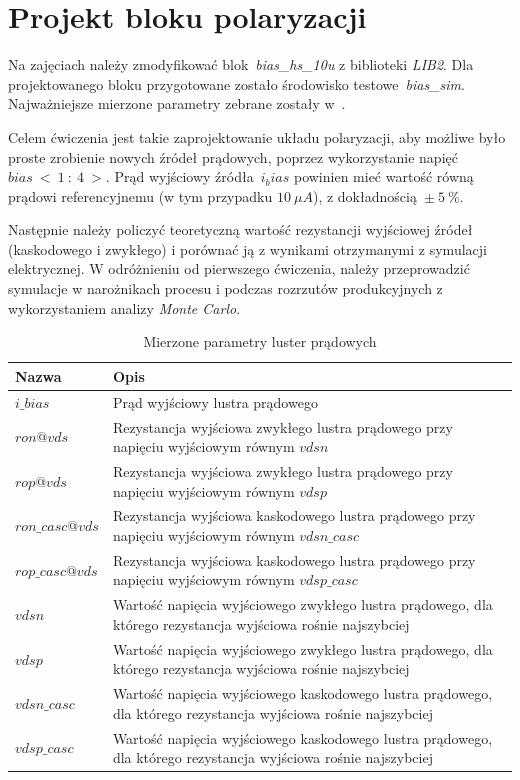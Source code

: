 \documentclass[twoside,pl,final]{labman}
\begin{document}
\chapter{Projekt bloku polaryzacji}
\label{work}

Na zajęciach należy zmodyfikować blok~\emph{bias\_hs\_10u}
z biblioteki \emph{LIB2}.
Dla projektowanego bloku przygotowane zostało
środowisko testowe~\emph{bias\_sim}.
Najważniejsze mierzone parametry zebrane
zostały w~.

Celem ćwiczenia jest takie zaprojektowanie układu polaryzacji,
aby możliwe było proste zrobienie nowych źródeł prądowych,
poprzez wykorzystanie napięć~$bias~<~1~:~4~>$.
Prąd wyjściowy źródła~$i_bias$ powinien mieć wartość
równą prądowi referencyjnemu (w tym przypadku $10~\mu{}A$),
z dokładnością~$\pm~5~\%$.

Następnie należy policzyć teoretyczną wartość rezystancji wyjściowej
źródeł (kaskodowego i zwykłego) i porównać ją
z wynikami otrzymanymi z symulacji elektrycznej.
W odróżnieniu od pierwszego ćwiczenia,
należy przeprowadzić symulacje w narożnikach procesu
 i podczas rozrzutów produkcyjnych z
wykorzystaniem analizy \emph{Monte Carlo}.

\begin{table}[htbp]
  \centering
  \caption{Mierzone parametry luster prądowych}
  \label{tab:work:measure}
  \begin{tabular}{l p{}}
    \hline \hline
    Nazwa & Opis \\
    \hline
    $i\_bias$ & Prąd wyjściowy lustra prądowego \\
    $ron@vds$ & Rezystancja wyjściowa zwykłego lustra prądowego przy napięciu wyjściowym równym $vdsn$ \\
    $rop@vds$ & Rezystancja wyjściowa zwykłego lustra prądowego przy napięciu wyjściowym równym $vdsp$ \\
    $ron\_casc@vds$ & Rezystancja wyjściowa kaskodowego lustra prądowego przy napięciu wyjściowym równym $vdsn\_casc$ \\
    $rop\_casc@vds$ & Rezystancja wyjściowa kaskodowego lustra prądowego przy napięciu wyjściowym równym $vdsp\_casc$ \\
    $vdsn$ & Wartość napięcia wyjściowego zwykłego lustra prądowego, dla którego rezystancja wyjściowa rośnie najszybciej \\
    $vdsp$ & Wartość napięcia wyjściowego zwykłego lustra prądowego, dla którego rezystancja wyjściowa rośnie najszybciej \\
    $vdsn\_casc$ & Wartość napięcia wyjściowego kaskodowego lustra prądowego, dla którego rezystancja wyjściowa rośnie najszybciej \\
    $vdsp\_casc$ & Wartość napięcia wyjściowego kaskodowego lustra prądowego, dla którego rezystancja wyjściowa rośnie najszybciej \\
    \hline \hline
  \end{tabular}
\end{table}
\end{document}
